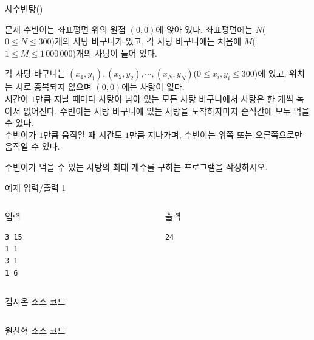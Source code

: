 ﻿

\begin{frame}[label=p3]{사수빈탕(\prob)}
\small

\begin{block}{문제}
수빈이는 좌표평면 위의 원점 $(0, 0)$에 앉아 있다. 좌표평면에는 $N$($0 \le N \le 300$)개의 사탕 바구니가 있고, 각 사탕 바구니에는 처음에 $M$($1 \le M \le 1\,000\,000$)개의 사탕이 들어 있다.

각 사탕 바구니는 $(x_1, y_1), (x_2, y_2), \cdots, (x_N, y_N)$($0 \le x_i, y_i \le 300$)에 있고, 위치는 서로 중복되지 않으며 $(0, 0)$에는 사탕이 없다. \\

시간이 $1$만큼 지날 때마다 사탕이 남아 있는 모든 사탕 바구니에서 사탕은 한 개씩 녹아서 없어진다. 수빈이는 사탕 바구니에 있는 사탕을 도착하자마자 순식간에 모두 먹을 수 있다. \\

수빈이가 $1$만큼 움직일 때 시간도 $1$만큼 지나가며, 수빈이는 위쪽 또는 오른쪽으로만 움직일 수 있다.

수빈이가 먹을 수 있는 사탕의 최대 개수를 구하는 프로그램을 작성하시오.
\end{block}
\end{frame}

\begin{frame}[fragile]{예제 입력/출력 1}
\begin{columns}[T]
\begin{column}{0.48\textwidth}
\begin{block}{입력}
\begin{verbatim}
3 15
1 1
3 1
1 6
\end{verbatim}
\end{block}
\end{column}
\begin{column}{0.48\textwidth}
\begin{block}{출력}
\begin{verbatim}
24
\end{verbatim}
\end{block}
\end{column}
\end{columns}
\end{frame}

\begin{frame}{김시온 소스 코드}
\inputminted{java}{../src/\prob/sion/Main.java}
\end{frame}

\begin{frame}{원찬혁 소스 코드}
\inputminted{java}{../src/\prob/chanhyeok/Main.java}
\end{frame}


